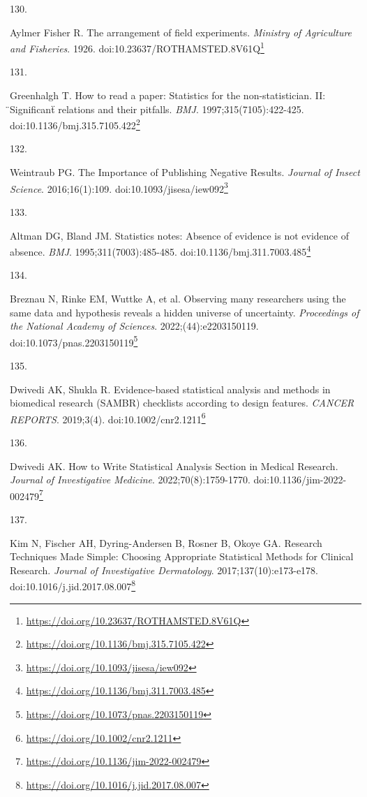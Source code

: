 \documentclass[
  a4paper,
]{book}
\newlength{\cslhangindent}
\newlength{\csllabelwidth}
\newlength{\cslentryspacingunit} %
\newenvironment{CSLReferences}[2] %
 {%
  \setlength{\parindent}{0pt}
  \ifodd #1
  \let\oldpar\par
  \def\par{\hangindent=\cslhangindent\oldpar}
  \fi
  \setlength{\parskip}{#2\cslentryspacingunit}
 }%
 {}
\newcommand{\CSLLeftMargin}[1]{\parbox[t]{\csllabelwidth}{#1}}
\newcommand{\CSLRightInline}[1]{\parbox[t]{\linewidth - \csllabelwidth}{#1}\break}
\renewcommand{\href}[2]{#2\footnote{\url{#1}}}
\begin{document}
\begin{CSLReferences}{0}{0}
\leavevmode{}%
\CSLLeftMargin{130. }%
\CSLRightInline{Aylmer Fisher R. The arrangement of field experiments. \emph{Ministry of Agriculture and Fisheries}. 1926. doi:\href{https://doi.org/10.23637/ROTHAMSTED.8V61Q}{10.23637/ROTHAMSTED.8V61Q}}

\leavevmode{}%
\CSLLeftMargin{131. }%
\CSLRightInline{Greenhalgh T. How to read a paper: Statistics for the non-statistician. II: {̈}Significant{̈} relations and their pitfalls. \emph{BMJ}. 1997;315(7105):422-425. doi:\href{https://doi.org/10.1136/bmj.315.7105.422}{10.1136/bmj.315.7105.422}}

\leavevmode{}%
\CSLLeftMargin{132. }%
\CSLRightInline{Weintraub PG. The Importance of Publishing Negative Results. \emph{Journal of Insect Science}. 2016;16(1):109. doi:\href{https://doi.org/10.1093/jisesa/iew092}{10.1093/jisesa/iew092}}

\leavevmode{}%
\CSLLeftMargin{133. }%
\CSLRightInline{Altman DG, Bland JM. Statistics notes: Absence of evidence is not evidence of absence. \emph{BMJ}. 1995;311(7003):485-485. doi:\href{https://doi.org/10.1136/bmj.311.7003.485}{10.1136/bmj.311.7003.485}}

\leavevmode{}%
\CSLLeftMargin{134. }%
\CSLRightInline{Breznau N, Rinke EM, Wuttke A, et al. Observing many researchers using the same data and hypothesis reveals a hidden universe of uncertainty. \emph{Proceedings of the National Academy of Sciences}. 2022;(44):e2203150119. doi:\href{https://doi.org/10.1073/pnas.2203150119}{10.1073/pnas.2203150119}}

\leavevmode{}%
\CSLLeftMargin{135. }%
\CSLRightInline{Dwivedi AK, Shukla R. Evidence{-}based statistical analysis and methods in biomedical research (SAMBR) checklists according to design features. \emph{CANCER REPORTS}. 2019;3(4). doi:\href{https://doi.org/10.1002/cnr2.1211}{10.1002/cnr2.1211}}

\leavevmode{}%
\CSLLeftMargin{136. }%
\CSLRightInline{Dwivedi AK. How to Write Statistical Analysis Section in Medical Research. \emph{Journal of Investigative Medicine}. 2022;70(8):1759-1770. doi:\href{https://doi.org/10.1136/jim-2022-002479}{10.1136/jim-2022-002479}}

\leavevmode{}%
\CSLLeftMargin{137. }%
\CSLRightInline{Kim N, Fischer AH, Dyring-Andersen B, Rosner B, Okoye GA. Research Techniques Made Simple: Choosing Appropriate Statistical Methods for Clinical Research. \emph{Journal of Investigative Dermatology}. 2017;137(10):e173-e178. doi:\href{https://doi.org/10.1016/j.jid.2017.08.007}{10.1016/j.jid.2017.08.007}}


\end{CSLReferences}
\end{document}
